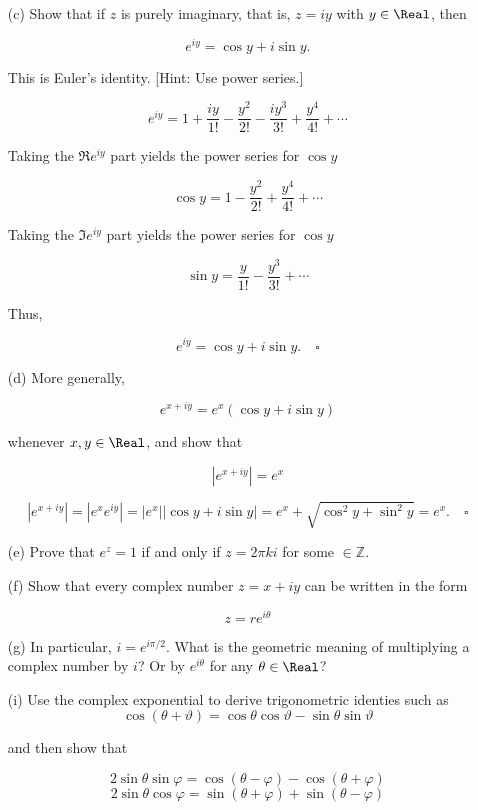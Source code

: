 \begin{enumerate}[label=(\alph*)]

    \item[(c)] Show that if $z$ is purely imaginary, that is, $z=iy$ with $y\in\Real$, then

        $$
        e^{iy} = \cos y + i \sin y.
        $$

        This is Euler's identity. [Hint: Use power series.]

        $$
        e^{iy} =1 + \frac{iy}{1!} - \frac{y^2}{2!} - \frac{iy^3}{3!}
        + \frac{y^4}{4!} + \cdots
        $$

        Taking the $\Re{e^{iy}}$ part yields the power series for $\cos{y}$

        $$
        \cos{y} = 1 - \frac{y^2}{2!} + \frac{y^4}{4!} + \cdots
        $$

        Taking the $\Im{e^{iy}}$ part yields the power series for $\cos{y}$

        $$
        \sin{y} = \frac{y}{1!} - \frac{y^3}{3!} + \cdots
        $$

        Thus,

        $$
        e^{iy} = \cos{y} + i\sin{y}.\quad\square
        $$
    
    \item[(d)] More generally,

        $$
        e^{x+iy} = e^{x}\left(\cos{y} + i\sin{y}\right)
        $$

        whenever $x,y\in\Real$, and show that

        $$
        \left|e^{x+iy}\right| = e^{x}
        $$

        $$
        \left|e^{x+iy}\right| = \left|e^{x}e^{iy}\right|
        =
        \left|e^{x}\right|\left|\cos{y}+i\sin{y}\right|
        =
        e^{x} + \sqrt{ \cos^2{y} + \sin^2{y}} = e^{x}.
        \quad\square
        $$
    
\newpage

    \item[(e)] Prove that $e^{z}=1$ if and only if $z=2\pi ki$ for some $\in\mathbb{Z}$.

    \item[(f)] Show that every complex number $z=x+iy$ can be written in the form

        $$
        z=re^{i\theta}
        $$

    \item[(g)] In particular, $i=e^{i\pi/2}$. What is the geometric meaning of multiplying a
        complex number by $i$? Or by $e^{i\theta}$ for any $\theta\in\Real$?

    \item[(i)] Use the complex exponential to derive trigonometric identies such as
        $$
        \cos(\theta+\vartheta) = \cos\theta\cos\vartheta - \sin\theta\sin\vartheta
        $$

        and then show that

        $$
        2\sin\theta\sin\varphi = \cos(\theta-\varphi)-\cos(\theta+\varphi)
        $$
        $$
        2\sin\theta\cos\varphi = \sin(\theta+\varphi) + \sin(\theta-\varphi)
        $$

\end{enumerate}

